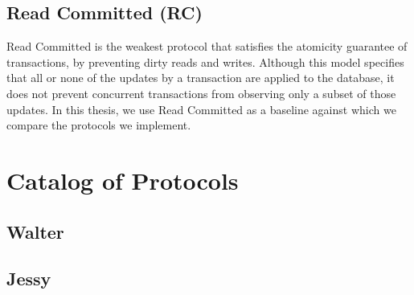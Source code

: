 \subsection{Read Committed (RC)}

Read Committed is the weakest protocol that satisfies the atomicity guarantee of transactions, by preventing dirty reads and writes. Although this model specifies that all or none of the updates by a transaction are applied to the database, it does not prevent concurrent transactions from observing only a subset of those updates. In this thesis, we use Read Committed as a baseline against which we compare the protocols we implement. 

\section{Catalog of Protocols}
\subsection{Walter}
\subsection{Jessy}

